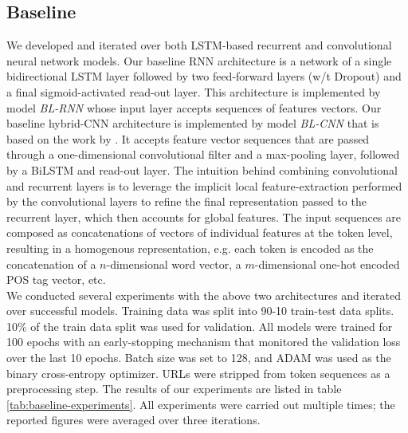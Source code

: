 \documentclass[11pt]{article}
\begin{document}
\subsection{Baseline}
We developed and iterated over both LSTM-based \cite{hochreiter1997long} recurrent and convolutional \cite{o2015introduction}
neural network models. Our baseline RNN architecture is a network of a single bidirectional LSTM layer followed by two feed-forward layers (w/t Dropout) and a final sigmoid-activated read-out layer. This architecture is implemented by model \emph{BL-RNN}
whose input layer accepts sequences of features vectors. Our baseline hybrid-CNN architecture is implemented by model
\emph{BL-CNN} that is based on the work by . It accepts feature vector
sequences that are passed through a one-dimensional convolutional filter and a max-pooling layer, followed by a BiLSTM and read-out
layer. The intuition behind combining convolutional and recurrent layers is to leverage the implicit local feature-extraction performed by the convolutional layers to refine the final representation passed to the recurrent layer, which then accounts for global features. The input sequences are composed as concatenations of vectors of individual features at the token level,
resulting in a homogenous representation, e.g. each token is encoded as the concatenation of a $n$-dimensional word vector,
a $m$-dimensional one-hot encoded POS tag vector, etc.\\

We conducted several experiments with the above two architectures and iterated over successful models. Training data was split into 90-10 train-test data splits.
10\% of the train data split was used for validation. All models were trained for 100 epochs with an early-stopping mechanism
that monitored the validation loss over the last 10 epochs. Batch size was set to 128, and ADAM \cite{kingma2014adam} was used
as the binary cross-entropy optimizer. URLs were stripped from token sequences as a preprocessing step. The results of our experiments are listed in table \ref{tab:baseline-experiments}. All experiments were carried out multiple times; the reported
figures were averaged over three iterations.\\
\end{document}

